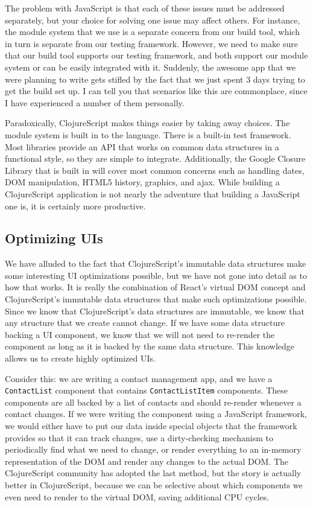 \documentclass[10pt,twoside,openright]{memoir}
\begin{document}
The problem with JavaScript is that each of these issues must be
addressed separately, but your choice for solving one issue may affect
others. For instance, the module system that we use is a separate
concern from our build tool, which in turn is separate from our testing
framework. However, we need to make sure that our build tool supports
our testing framework, and both support our module system or can be
easily integrated with it. Suddenly, the awesome app that we were
planning to write gets stifled by the fact that we just spent 3 days
trying to get the build set up. I can tell you that scenarios like this
are commonplace, since I have experienced a number of them personally.

Paradoxically, ClojureScript makes things easier by taking away choices.
The module system is built in to the language. There is a built-in test
framework. Most libraries provide an API that works on common data
structures in a functional style, so they are simple to integrate.
Additionally, the Google Closure Library that is built in will cover
most common concerns such as handling dates, DOM manipulation, HTML5
history, graphics, and ajax. While building a ClojureScript application
is not nearly the adventure that building a JavaScript one is, it is
certainly more productive.

\subsection{Optimizing UIs}

We have alluded to the fact that ClojureScript's immutable data
structures make some interesting UI optimizations possible, but we have
not gone into detail as to how that works. It is really the combination
of React's virtual DOM concept and ClojureScript's immutable data
structures that make such optimizations possible. Since we know that
ClojureScript's data structures are immutable, we know that any
structure that we create cannot change. If we have some data structure
backing a UI component, we know that we will not need to re-render the
component as long as it is backed by the same data structure. This
knowledge allows us to create highly optimized UIs.

Consider this: we are writing a contact management app, and we have a
\texttt{ContactList} component that contains \texttt{ContactListItem}
components. These components are all backed by a list of contacts and
should re-render whenever a contact changes. If we were writing the
component using a JavaScript framework, we would either have to put our
data inside special objects that the framework provides so that it can
track changes, use a dirty-checking mechanism to periodically find what
we need to change, or render everything to an in-memory representation
of the DOM and render any changes to the actual DOM. The ClojureScript
community has adopted the last method, but the story is actually better
in ClojureScript, because we can be selective about which components we
even need to render to the virtual DOM, saving additional CPU cycles.
\end{document}
